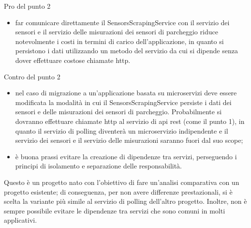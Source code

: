 \leavevmode\newline
Pro del punto 2
\begin{itemize}
    \item far comunicare direttamente il SensorsScrapingService con il servizio dei sensori e il servizio delle misurazioni dei sensori di parcheggio
        riduce notevolmente i costi in termini di carico dell'applicazione, in quanto si persistono i dati utilizzando un
        metodo del servizio da cui si dipende senza dover effettuare costose chiamate \gls{http}. 
\end{itemize}
\leavevmode\newline
Contro del punto 2
\begin{itemize}
    \item nel caso di migrazione a un'applicazione basata su microservizi deve essere modificata la modalità in cui il SensorsScrapingService 
        persiste i dati dei sensori
        e delle misurazioni dei sensori di parcheggio. Probabilmente si dovranno effettuare chiamate \gls{http} al servizio di \gls{api} \gls{rest} (come il punto 1),
        in quanto il servizio di polling diventerà un microservizio indipendente e il servizio dei 
        sensori e il servizio delle misurazioni saranno fuori dal suo scope;
    \item è buona prassi evitare la creazione di dipendenze tra servizi, perseguendo i
        principi di isolamento e separazione delle responsabilità.
\end{itemize}
\leavevmode\newline
Questo è un progetto nato con l'obiettivo di fare un'analisi comparativa con un progetto esistente;
di conseguenza, per non avere differenze prestazionali, si è scelta la variante più simile al 
servizio di polling dell'altro progetto. Inoltre, non è sempre possibile evitare le dipendenze tra servizi
che sono comuni in molti applicativi.

